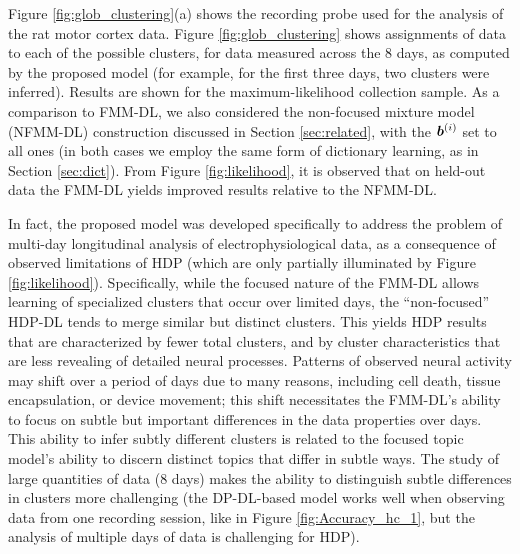 \documentclass[journal]{IEEEtran}
\begin{document}
{Figure }\ref{fig:glob_clustering}{(a) shows the recording probe used for the analysis of the rat motor cortex data.}  Figure \ref{fig:glob_clustering} {shows} assignments of data to each of the possible clusters, for data measured across the 8 days, as computed by the proposed model (for example, for the first three days, two clusters were inferred). Results are shown for the maximum-likelihood collection sample. As a comparison to {FMM-DL,} 
we also considered the {non-focused mixture model (NFMM-DL)} construction discussed in Section \ref{sec:related}, with the $\boldsymbol{b}^{(i)}$ set to all ones (in both cases we employ the same form of dictionary learning, as in Section \ref{sec:dict}). From Figure \ref{fig:likelihood}, it is observed that on held-out data the FMM{-DL} yields improved results relative to the {NFMM-DL}.

In fact, the proposed model was developed specifically to address the problem of multi-day {longitudinal} analysis of electrophysiological data, as a consequence of observed limitations of HDP (which are only partially illuminated by Figure \ref{fig:likelihood}). Specifically, while the focused nature of the FMM{-DL} allows learning of specialized clusters that occur over limited days, the ``non-focused'' HDP{-DL} tends to merge similar but distinct clusters. This yields HDP results that are characterized by fewer total clusters, and by cluster characteristics that are less revealing of detailed neural processes. Patterns of observed neural activity may shift over a period of days due to many reasons, including cell death, tissue encapsulation, or device movement; this shift necessitates the FMM{-DL}'s ability to focus on subtle but important differences in the data properties over days. This ability to infer subtly different clusters is related to the focused topic model's ability  \cite{compound} to discern distinct topics that differ in subtle ways. The study of large quantities of data (8 days) makes the ability to distinguish subtle differences in clusters more challenging (the DP-DL-based model works well when observing data from one recording session, like in Figure \ref{fig:Accuracy_hc_1}, but the analysis of multiple days of data is challenging for HDP).
\end{document}
